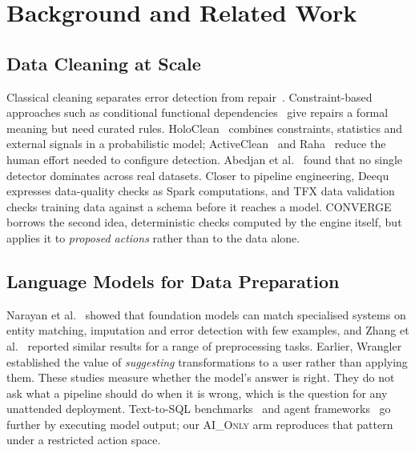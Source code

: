 \section{Background and Related Work}
\label{sec:related}
\subsection{Data Cleaning at Scale}
Classical cleaning separates error detection from repair~\cite{rahm2000cleaning,chu2016cleaning,ilyas2019cleaning,hellerstein2008quantitative}. Constraint-based approaches such as conditional functional dependencies~\cite{fan2008cfd} give repairs a formal meaning but need curated rules. HoloClean~\cite{rekatsinas2017holoclean} combines constraints, statistics and external signals in a probabilistic model; ActiveClean~\cite{krishnan2016activeclean} and Raha~\cite{mahdavi2019raha} reduce the human effort needed to configure detection. Abedjan et al.~\cite{abedjan2016detecting} found that no single detector dominates across real datasets. Closer to pipeline engineering, Deequ~\cite{schelter2018deequ} expresses data-quality checks as Spark computations, and TFX data validation~\cite{breck2019validation} checks training data against a schema before it reaches a model. CONVERGE borrows the second idea, deterministic checks computed by the engine itself, but applies it to \emph{proposed actions} rather than to the data alone.

\subsection{Language Models for Data Preparation}
Narayan et al.~\cite{narayan2022foundation} showed that foundation models can match specialised systems on entity matching, imputation and error detection with few examples, and Zhang et al.~\cite{zhang2023preprocessors} reported similar results for a range of preprocessing tasks. Earlier, Wrangler~\cite{kandel2011wrangler} established the value of \emph{suggesting} transformations to a user rather than applying them. These studies measure whether the model's answer is right. They do not ask what a pipeline should do when it is wrong, which is the question for any unattended deployment. Text-to-SQL benchmarks~\cite{rajkumar2022texttosql,li2023bird} and agent frameworks~\cite{yao2023react,schick2023toolformer,shinn2023reflexion} go further by executing model output; our \textsc{AI\_Only} arm reproduces that pattern under a restricted action space.

